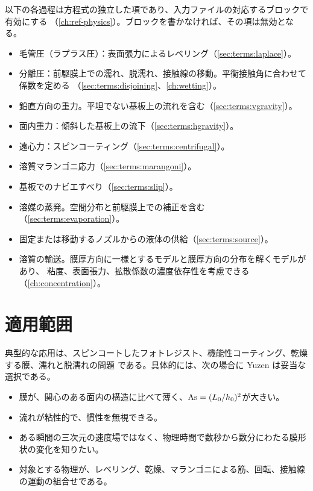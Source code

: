 以下の各過程は方程式の独立した項であり、入力ファイルの対応するブロックで有効にする
（\cref{ch:ref-physics}）。ブロックを書かなければ、その項は無効となる。

\begin{itemize}
  \item 毛管圧（ラプラス圧）：表面張力によるレベリング（\cref{sec:terms:laplace}）。
  \item 分離圧：前駆膜上での濡れ、脱濡れ、接触線の移動。平衡接触角に合わせて係数を定める
    （\cref{sec:terms:disjoining}、\cref{ch:wetting}）。
  \item 鉛直方向の重力。平坦でない基板上の流れを含む（\cref{sec:terms:vgravity}）。
  \item 面内重力：傾斜した基板上の流下（\cref{sec:terms:hgravity}）。
  \item 遠心力：スピンコーティング（\cref{sec:terms:centrifugal}）。
  \item 溶質マランゴニ応力（\cref{sec:terms:marangoni}）。
  \item 基板でのナビエすべり（\cref{sec:terms:slip}）。
  \item 溶媒の蒸発。空間分布と前駆膜上での補正を含む（\cref{sec:terms:evaporation}）。
  \item 固定または移動するノズルからの液体の供給（\cref{sec:terms:source}）。
  \item 溶質の輸送。膜厚方向に一様とするモデルと膜厚方向の分布を解くモデルがあり、
    粘度、表面張力、拡散係数の濃度依存性を考慮できる（\cref{ch:concentration}）。
\end{itemize}

\section{適用範囲}
\label{sec:intro:uses}

典型的な応用は、スピンコートしたフォトレジスト、機能性コーティング、乾燥する膜、濡れと脱濡れの問題
である。具体的には、次の場合に Yuzen は妥当な選択である。

\begin{itemize}
  \item 膜が、関心のある面内の構造に比べて薄く、$\mathrm{As} = (L_0/h_0)^2$が大きい。
  \item 流れが粘性的で、慣性を無視できる。
  \item ある瞬間の三次元の速度場ではなく、物理時間で数秒から数分にわたる膜形状の変化を知りたい。
  \item 対象とする物理が、レベリング、乾燥、マランゴニによる筋、回転、接触線の運動の組合せである。
\end{itemize}

